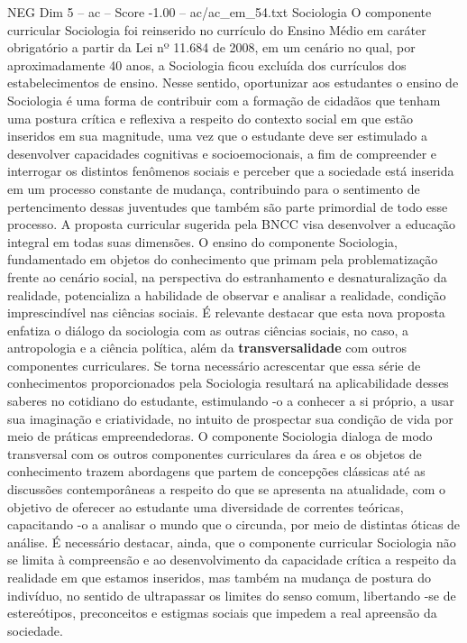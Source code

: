 \begin{textsample}{NEG Dim 5 – ac – Score -1.00 – ac/ac\_em\_54.txt}  \label{ex:f5_neg_166}
Sociologia O componente curricular Sociologia foi reinserido no currículo do Ensino Médio em caráter obrigatório a partir da Lei nº 11.684 de 2008, em um cenário no qual, por aproximadamente 40 anos, a Sociologia ficou excluída dos currículos dos estabelecimentos de ensino.
Nesse sentido, oportunizar aos estudantes o ensino de Sociologia é uma forma de contribuir com a formação de cidadãos que tenham uma postura crítica e reflexiva a respeito do contexto social em que estão inseridos em sua magnitude, uma vez que o estudante deve ser estimulado a desenvolver capacidades cognitivas e socioemocionais, a fim de compreender e interrogar os distintos fenômenos sociais e perceber que a sociedade está inserida em um processo constante de mudança, contribuindo para o sentimento de pertencimento dessas juventudes que também são parte primordial de todo esse processo.
A proposta curricular sugerida pela BNCC visa desenvolver a educação integral em todas suas dimensões.
O ensino do componente Sociologia, fundamentado em objetos do conhecimento que primam pela problematização frente ao cenário social, na perspectiva do estranhamento e desnaturalização da realidade, potencializa a habilidade de observar e analisar a realidade, condição imprescindível nas ciências sociais.
É relevante destacar que esta nova proposta enfatiza o diálogo da sociologia com as outras ciências sociais, no caso, a antropologia e a ciência política, além da \textbf{transversalidade} com outros componentes curriculares.
Se torna necessário acrescentar que essa série de conhecimentos proporcionados pela Sociologia resultará na aplicabilidade desses saberes no cotidiano do estudante, estimulando -o a conhecer a si próprio, a usar sua imaginação e criatividade, no intuito de prospectar sua condição de vida por meio de práticas empreendedoras.
O componente Sociologia dialoga de modo transversal com os outros componentes curriculares da área e os objetos de conhecimento trazem abordagens que partem de concepções clássicas até as discussões contemporâneas a respeito do que se apresenta na atualidade, com o objetivo de oferecer ao estudante uma diversidade de correntes teóricas, capacitando -o a analisar o mundo que o circunda, por meio de distintas óticas de análise.
É necessário destacar, ainda, que o componente curricular Sociologia não se limita à compreensão e ao desenvolvimento da capacidade crítica a respeito da realidade em que estamos inseridos, mas também na mudança de postura do indivíduo, no sentido de ultrapassar os limites do senso comum, libertando -se de estereótipos, preconceitos e estigmas sociais que impedem a real apreensão da sociedade.

\end{textsample}
